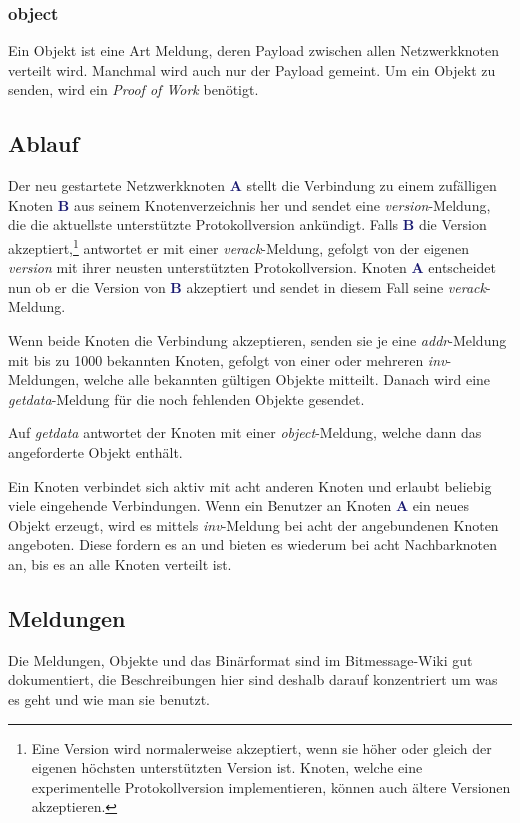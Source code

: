 \documentclass{bfh}
\newcommand{\msg}[1]{\textit{\textcolor{RedOrange}{#1}}}
\newcommand{\node}[1]{\textbf{\textcolor{MidnightBlue}{#1}}}
\begin{document}
  \subsubsection{object}
  Ein Objekt ist eine Art Meldung, deren Payload zwischen allen Netzwerkknoten verteilt wird. Manchmal wird auch nur der Payload gemeint. Um ein Objekt zu senden, wird ein \textit{Proof of Work} benötigt.

  \subsection{Ablauf}

  Der neu gestartete Netzwerkknoten \node{A} stellt die Verbindung zu einem zufälligen Knoten \node{B} aus seinem Knotenverzeichnis her und sendet eine \msg{version}-Meldung, die die aktuellste unterstützte Protokollversion ankündigt. Falls \node{B} die Version akzeptiert,\footnote{Eine Version wird normalerweise akzeptiert, wenn sie höher oder gleich der eigenen höchsten unterstützten Version ist. Knoten, welche eine experimentelle Protokollversion implementieren, können auch ältere Versionen akzeptieren.} antwortet er mit einer \msg{verack}-Meldung, gefolgt von der eigenen \msg{version} mit ihrer neusten unterstützten Protokollversion. Knoten \node{A} entscheidet nun ob er die Version von \node{B} akzeptiert und sendet in diesem Fall seine \msg{verack}-Meldung.

  Wenn beide Knoten die Verbindung akzeptieren, senden sie je eine \msg{addr}-Meldung mit bis zu 1000 bekannten Knoten, gefolgt von einer oder mehreren \msg{inv}-Meldungen, welche alle bekannten gültigen Objekte mitteilt. Danach wird eine \msg{getdata}-Meldung für die noch fehlenden Objekte gesendet.

  Auf \msg{getdata} antwortet der Knoten mit einer \msg{object}-Meldung, welche dann das angeforderte Objekt enthält.

  Ein Knoten verbindet sich aktiv mit acht anderen Knoten und erlaubt beliebig viele eingehende Verbindungen. Wenn ein Benutzer an Knoten \node{A} ein neues Objekt erzeugt, wird es mittels \msg{inv}-Meldung bei acht der angebundenen Knoten angeboten. Diese fordern es an und bieten es wiederum bei acht Nachbarknoten an, bis es an alle Knoten verteilt ist.

  \subsection{Meldungen}

  Die Meldungen, Objekte und das Binärformat sind im Bitmessage-Wiki gut dokumentiert, die Beschreibungen hier sind deshalb darauf konzentriert um was es geht und wie man sie benutzt.\cite{wiki:protocol}
\end{document}
